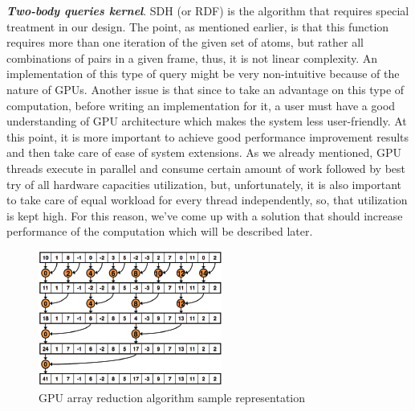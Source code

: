 \documentclass[12pt,letterpaper]{report}
\begin{document}
\emph{\textbf{Two-body queries kernel}}.
SDH (or RDF) is the algorithm that requires special treatment in our design. The point, as mentioned earlier, is that this function requires more than one iteration of the given set of atoms, but rather all combinations of pairs in a given frame, thus, it is not linear complexity. An implementation of this type of query might be very non-intuitive because of the nature of GPUs. Another issue is that since to take an advantage on this type of computation, before writing an implementation for it, a user must have a good understanding of GPU architecture which makes the system less user-friendly. At this point, it is more important to achieve good performance improvement results and then take care of ease of system extensions. As we already mentioned, GPU threads execute in parallel and consume certain amount of work followed by best try of all hardware capacities utilization, but, unfortunately, it is also important to take care of equal workload for every thread independently, so, that utilization is kept high. For this reason, we've come up with a solution that should increase performance of the computation which will be described later.

\begin{figure}
 \centerline{ \includegraphics[width=0.65\columnwidth]{images/reduction} }
 \caption{GPU array reduction algorithm sample representation}
 \label{fg:reduction}
\end{figure}
\end{document}
